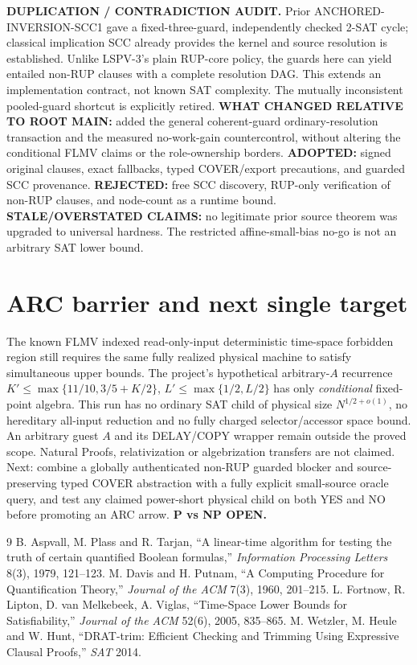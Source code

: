 \documentclass[11pt]{article}
\begin{document}
\textbf{DUPLICATION / CONTRADICTION AUDIT.} Prior ANCHORED-INVERSION-SCC1 gave a fixed-three-guard, independently checked 2-SAT cycle; classical implication SCC already provides the kernel and source resolution is established. Unlike LSPV-3's plain RUP-core policy, the guards here can yield entailed non-RUP clauses with a complete resolution DAG. This extends an implementation contract, not known SAT complexity. The mutually inconsistent pooled-guard shortcut is explicitly retired. \textbf{WHAT CHANGED RELATIVE TO ROOT MAIN:} added the general coherent-guard ordinary-resolution transaction and the measured no-work-gain countercontrol, without altering the conditional FLMV claims or the role-ownership borders. \textbf{ADOPTED:} signed original clauses, exact fallbacks, typed COVER/export precautions, and guarded SCC provenance. \textbf{REJECTED:} free SCC discovery, RUP-only verification of non-RUP clauses, and node-count as a runtime bound. \textbf{STALE/OVERSTATED CLAIMS:} no legitimate prior source theorem was upgraded to universal hardness. The restricted affine-small-bias no-go is not an arbitrary SAT lower bound.

\section{ARC barrier and next single target}
The known FLMV indexed read-only-input deterministic time-space forbidden region still requires the same fully realized physical machine to satisfy simultaneous upper bounds. The project's hypothetical arbitrary-$A$ recurrence $K'\le\max\{11/10,3/5+K/2\}$, $L'\le\max\{1/2,L/2\}$ has only \emph{conditional} fixed-point algebra. This run has no ordinary SAT child of physical size $N^{1/2+o(1)}$, no hereditary all-input reduction and no fully charged selector/accessor space bound. An arbitrary guest $A$ and its DELAY/COPY wrapper remain outside the proved scope. Natural Proofs, relativization or algebrization transfers are not claimed. Next: combine a globally authenticated non-RUP guarded blocker and source-preserving typed COVER abstraction with a fully explicit small-source oracle query, and test any claimed power-short physical child on both YES and NO before promoting an ARC arrow. \textbf{P vs NP OPEN.}

\begin{thebibliography}{9}
 B. Aspvall, M. Plass and R. Tarjan, ``A linear-time algorithm for testing the truth of certain quantified Boolean formulas,'' \emph{Information Processing Letters} 8(3), 1979, 121--123.
 M. Davis and H. Putnam, ``A Computing Procedure for Quantification Theory,'' \emph{Journal of the ACM} 7(3), 1960, 201--215.
 L. Fortnow, R. Lipton, D. van Melkebeek, A. Viglas, ``Time-Space Lower Bounds for Satisfiability,'' \emph{Journal of the ACM} 52(6), 2005, 835--865.
 M. Wetzler, M. Heule and W. Hunt, ``DRAT-trim: Efficient Checking and Trimming Using Expressive Clausal Proofs,'' \emph{SAT} 2014.
\end{thebibliography}
\end{document}

